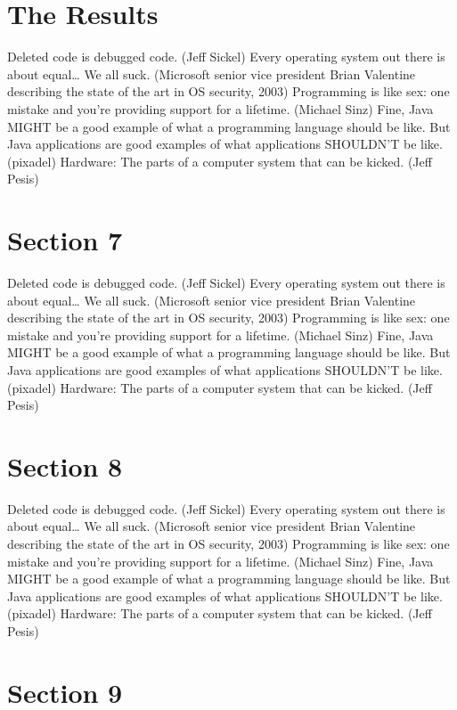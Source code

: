 \documentclass[11pt,a4paper]{article}
\begin{document}
\section{The Results}

Deleted code is debugged code. (Jeff Sickel) Every operating system out there is about equal… We all suck. (Microsoft senior vice president Brian Valentine describing the state of the art in OS security, 2003) Programming is like sex: one mistake and you’re providing support for a lifetime. (Michael Sinz) Fine, Java MIGHT be a good example of what a programming language should be like. But Java applications are good examples of what applications SHOULDN’T be like. (pixadel) Hardware: The parts of a computer system that can be kicked. (Jeff Pesis)

\section{Section 7}
\label{sec:supplementary}

Deleted code is debugged code. (Jeff Sickel) Every operating system out there is about equal… We all suck. (Microsoft senior vice president Brian Valentine describing the state of the art in OS security, 2003) Programming is like sex: one mistake and you’re providing support for a lifetime. (Michael Sinz) Fine, Java MIGHT be a good example of what a programming language should be like. But Java applications are good examples of what applications SHOULDN’T be like. (pixadel) Hardware: The parts of a computer system that can be kicked. (Jeff Pesis)

\section{Section 8}
\label{ssec:accessibility}

Deleted code is debugged code. (Jeff Sickel) Every operating system out there is about equal… We all suck. (Microsoft senior vice president Brian Valentine describing the state of the art in OS security, 2003) Programming is like sex: one mistake and you’re providing support for a lifetime. (Michael Sinz) Fine, Java MIGHT be a good example of what a programming language should be like. But Java applications are good examples of what applications SHOULDN’T be like. (pixadel) Hardware: The parts of a computer system that can be kicked. (Jeff Pesis)

\section{Section 9}
\end{document}
